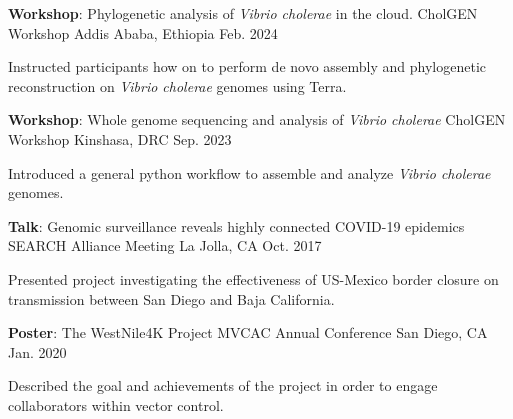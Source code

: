 
 \begin{cventries}
  \cventry
    {\textbf{Workshop}: Phylogenetic analysis of \textit{Vibrio cholerae} in the cloud.} %
    {CholGEN Workshop} %
    {Addis Ababa, Ethiopia} %
    {Feb. 2024} %
    {
      \begin{cvitems} %
        \item {Instructed participants how on to perform de novo assembly and phylogenetic reconstruction on \textit{Vibrio cholerae} genomes using Terra.}
      \end{cvitems}
    }

  
  \cventry
     {\textbf{Workshop}: Whole genome sequencing and analysis of \textit{Vibrio cholerae}} %
    {CholGEN Workshop} %
    {Kinshasa, DRC} %
    {Sep. 2023} %
    {
      \begin{cvitems} %
      \item {Introduced a general python workflow to assemble and analyze \textit{Vibrio cholerae} genomes.}
      \end{cvitems}
    }


  \cventry
    {\textbf{Talk}: Genomic surveillance reveals highly connected COVID-19 epidemics} %
    {SEARCH Alliance Meeting} %
    {La Jolla, CA} %
    {Oct. 2017} %
    {
      \begin{cvitems} %
        \item{Presented project investigating the effectiveness of US-Mexico border closure on transmission between San Diego and Baja California.}
      \end{cvitems}
    }
    
  \cventry
    {\textbf{Poster}: The WestNile4K Project} %
    {MVCAC Annual Conference} %
    {San Diego, CA} %
    {Jan. 2020} %
    {
      \begin{cvitems} %
        \item {Described the goal and achievements of the project in order to engage collaborators within vector control.}
      \end{cvitems}
    }


\end{cventries}
